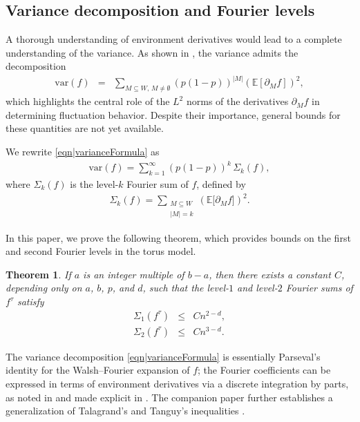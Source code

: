 \documentclass[reqno]{amsart}
\newtheorem{theorem}{Theorem}[section]
\begin{document}
\subsection{Variance decomposition and Fourier levels} 

A thorough understanding of environment derivatives would lead to a complete understanding of the variance. As shown in \cite{FirstPaper2025}, the variance admits the decomposition
\begin{eqnarray}
\mathrm{var}(f)
&=&
\sum_{M\subseteq W,\, M\neq\emptyset}
\left(p(1-p)\right)^{|M|}
\left(\mathbb{E}\left[\partial_M f\right]\right)^2,
\label{eqn|varianceFormula}
\end{eqnarray}
which highlights the central role of the $L^2$ norms of the derivatives $\partial_M f$ in determining fluctuation behavior. Despite their importance, general bounds for these quantities are not yet available.

We rewrite \eqref{eqn|varianceFormula} as
\begin{eqnarray}
\mathrm{var}(f)
=
\sum_{k=1}^{\infty} (p(1-p))^k\, \Sigma_k(f),
\label{eqn|varianceFormulaWeights}
\end{eqnarray}
where $\Sigma_k(f)$ is the level-$k$ Fourier sum of $f$, defined by
\begin{eqnarray*}
\Sigma_k(f)
=
\sum_{\substack{M\subseteq W\\ |M|=k}}
\left(\mathbb{E}\big[\partial_M f\big]\right)^2. 
\end{eqnarray*}

In this paper, we prove the following theorem, which provides bounds on the first and second Fourier levels in the torus model. 

 

\begin{theorem}\label{thm|BoundFourierLevel2Torus}
If $a$ is an integer multiple of $b-a$, then there exists a constant $C$, depending only on $a$, $b$, $p$, and $d$, such that the level-$1$ and level-$2$ Fourier sums of $f^{\tau}$ satisfy
\begin{eqnarray}
\Sigma_1(f^{\tau}) &\leq& C n^{2-d},
\label{eqn|BoundFourierLevel1Torus}\\
\Sigma_2(f^{\tau}) &\leq& C n^{3-d}.
\label{eqn|BoundFourierLevel2Torus}
\end{eqnarray}
\end{theorem}

The variance decomposition \eqref{eqn|varianceFormula} is 
essentially Parseval's identity for the Walsh--Fourier expansion 
of $f$; the Fourier coefficients can be expressed in terms of 
environment derivatives via a discrete integration by parts, as 
noted in \cite{Tal2017} and made explicit in \cite{FirstPaper2025}. 
The companion paper \cite{FirstPaper2025} further establishes a 
generalization of Talagrand's and Tanguy's inequalities 
\cite{talagrand1994,Tanguy2018}.
\end{document}
